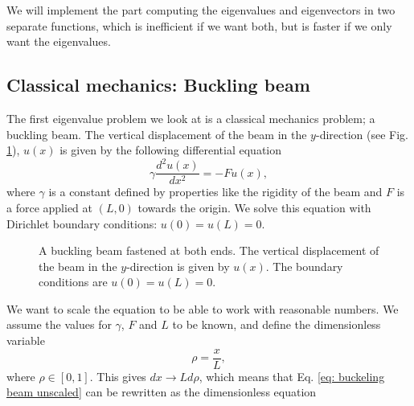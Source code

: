 \documentclass[%
 reprint,
nofootinbib,
aps,
]{revtex4-1}
\begin{document}
We will implement the part computing the eigenvalues and eigenvectors in two separate functions, which is inefficient if we want both, but is faster if we only want the eigenvalues.


\subsection{Classical mechanics: Buckling beam}

The first eigenvalue problem we look at is a classical mechanics problem; a buckling beam. The vertical displacement of the beam in the $y$-direction (see Fig. \ref{fig: buckling beam}), $u(x)$ is given by the following differential equation
\begin{equation}\label{eq: buckeling beam unscaled}
\gamma \frac{d^2 u(x)}{dx^2} = -Fu(x),
\end{equation}
where $\gamma$ is a constant defined by properties like the rigidity of the beam and $F$ is a force applied at $(L,0)$ towards the origin. We solve this equation with Dirichlet boundary conditions: $u(0) = u(L) = 0$.

\begin{figure}
\centering
{}

\caption{A buckling beam fastened at both ends. The vertical displacement of the beam in the $y$-direction is given by $u(x)$. The boundary conditions are $u(0) = u(L) = 0$.}
\label{fig: buckling beam}
\end{figure}

We want to scale the equation to be able to work with reasonable numbers. We assume the values for $\gamma$, $F$ and $L$ to be known, and define the dimensionless variable
\begin{equation}
\rho = \frac{x}{L},
\end{equation}
where $\rho \in [0,1]$. This gives $dx \rightarrow Ld\rho$, which means that Eq. \eqref{eq: buckeling beam unscaled} can be rewritten as the dimensionless equation
\end{document}
